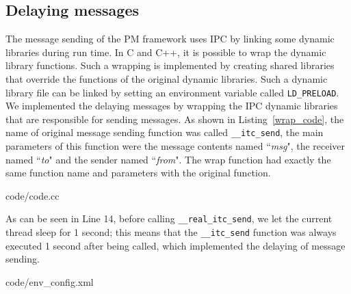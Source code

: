 \subsection{Delaying messages}\label{sec:delayingMessages}
The message sending of the PM framework uses IPC by linking some dynamic libraries during run time. In C and C++, it is possible to wrap the dynamic library functions. Such a wrapping is implemented by creating shared libraries that override the functions of the original dynamic libraries. Such a dynamic library file can be linked by setting an environment variable called \texttt{LD\_PRELOAD}. We implemented the delaying messages by wrapping the IPC dynamic libraries that are responsible for sending messages. As shown in Listing~\ref{wrap_code}, the name of original message sending function was called  \texttt{\_\_itc\_send}, the main parameters of this function were the message contents named ``{\em msg}", the receiver named ``{\em to}" and the sender named ``{\em from}". The wrap function had exactly the same function name and parameters with the original function. 

\begin{minipage}{.96\columnwidth}

{code/code.cc}
\end{minipage}


As can be seen in Line 14,
before calling \texttt{\_\_real\_itc\_send}, we let the current thread sleep for 1 second; %
this means that the \texttt{\_\_itc\_send} function was always executed 1 second after being called, which implemented the delaying of message sending.

\begin{minipage}{.96\columnwidth}

{code/env_config.xml}
\end{minipage}

